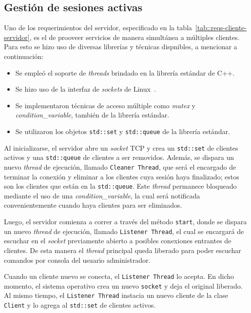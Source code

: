 \documentclass[../../main.tex]{subfiles}
\begin{document}
\subsection{Gestión de sesiones activas}
Uno de los requerimientos del servidor, especificado en la tabla~\ref{tab::reqs-cliente-servidor}, es el de prooveer servicios de manera simultánea a múltiples clientes. Para esto se hizo uso de diversas librerías y técnicas dispnibles, a mencionar a continuación:
\begin{itemize}
    \item Se empleó el soporte de \textit{threads} brindado en la librería estándar de C++.
    \item Se hizo uso de la interfaz de \textit{sockets} de Linux~\cite{linux-sockets}.
    \item Se implementaron técnicas de acceso múltiple como \textit{mutex} y \textit{condition\_variable}, también de la librería estándar.
    \item Se utilizaron los objetos \texttt{std::set} y \texttt{std::queue} de la librería estándar.
\end{itemize}

Al inicializarse, el servidor abre un \textit{socket} TCP y crea un \texttt{std::set} de clientes activos y una \texttt{std::queue} de clientes a ser removidos. Además, se dispara un nuevo \textit{thread} de ejecución, llamado \texttt{Cleaner Thread}, que será el encargado de terminar la conexión y eliminar a los clientes cuya sesión haya finalizado; estos son los clientes que están en la \texttt{std::queue}. Este \textit{thread} permanece bloqueado mediante el uso de una \textit{condition\_variable}, la cual será notificada convenientemente cuando haya clientes para ser eliminados.

Luego, el servidor comienza a correr a través del método \texttt{start}, donde se dispara un nuevo \textit{thread} de ejecución, llamado \texttt{Listener Thread}, el cual se encargará de escuchar en el \textit{socket} previamente abierto a posibles conexiones entrantes de clientes. De esta manera el \textit{thread} principal queda liberado para poder escuchar comandos por consola del usuario administrador.

Cuando un cliente nuevo se conecta, el \texttt{Listener Thread} lo acepta. En dicho momento, el sistema operativo crea un nuevo \texttt{socket} y deja el original liberado. Al mismo tiempo, el \texttt{Listener Thread} instacia un nuevo cliente de la clase \texttt{Client} y lo agrega al \texttt{std::set} de clientes activos.
\end{document}

